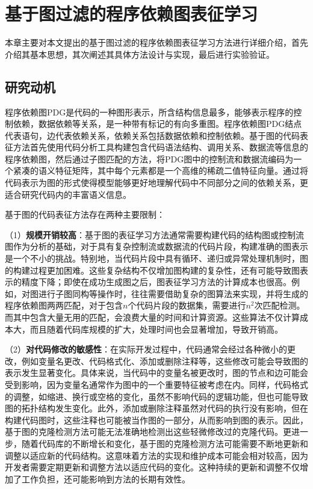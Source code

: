 \chapter{基于图过滤的程序依赖图表征学习}
\label{chap:PDG}
本章主要对本文提出的基于图过滤的程序依赖图表征学习方法进行详细介绍，首先介绍其基本思想，其次阐述其具体方法设计与实现，最后进行实验验证。

\section{研究动机}
\label{sec:PDGMotivation}

程序依赖图PDG是代码的一种图形表示，所含结构信息最多，能够表示程序的控制依赖，数据依赖等关系，是一种带有标记的有向多重图。程序依赖图PDG结点代表语句，边代表依赖关系，依赖关系包括数据依赖和控制依赖。基于图的代码表征方法首先使用代码分析工具构建包含代码语法结构、调用关系、数据流等信息的程序依赖图，然后通过子图匹配的方法，将PDG图中的控制流和数据流编码为一个紧凑的语义特征矩阵，其中每个元素都是一个高维的稀疏二值特征向量。通过将代码表示为图的形式使得模型能够更好地理解代码中不同部分之间的依赖关系，更适合研究代码内的丰富语义信息。

基于图的代码表征方法存在两种主要限制：

（1）\textbf{规模开销较高}：基于图的表征学习方法通常需要构建代码的结构图或控制流图作为分析的基础，对于具有复杂控制流或数据流的代码片段，构建准确的图表示是一个不小的挑战。特别地，当代码片段中具有循环、递归或异常处理机制时，图的构建过程更加困难。这些复杂结构不仅增加图构建的复杂性，还有可能导致图表示的精度下降；即使在成功生成图之后，图表征学习方法的计算成本也很高。例如，对图进行子图同构等操作时，往往需要借助复杂的图算法来实现，并将生成的程序依赖图两两匹配，对于包含$n$个代码片段的数据集，需要进行$n^2$次匹配检测。而其中包含大量无用的匹配，会浪费大量的时间和计算资源。这些算法不仅计算成本大，而且随着代码库规模的扩大，处理时间也会显著增加，导致开销高。

（2）\textbf{对代码修改的敏感性}：在实际开发过程中，代码通常会经过各种微小的更改，例如变量名更改、代码格式化、添加或删除注释等，这些修改可能会导致图的表示发生显著变化。具体来说，当代码中的变量名被更改时，图的节点和边可能会受到影响，因为变量名通常作为图中的一个重要特征被考虑在内。同样，代码格式的调整，如缩进、换行或空格的变化，虽然不影响代码的逻辑功能，但也可能导致图的拓扑结构发生变化。此外，添加或删除注释虽然对代码的执行没有影响，但在构建代码图时，这些注释也可能被当作图的一部分，从而影响到图的表示。因此，基于图的克隆检测方法可能无法准确地检测出这些轻微修改过的克隆代码。更进一步，随着代码库的不断增长和变化，基于图的克隆检测方法可能需要不断地更新和调整以适应新的代码结构。这意味着方法的实现和维护成本可能会相对较高，因为开发者需要定期更新和调整方法以适应代码的变化。这种持续的更新和调整不仅增加了工作负担，还可能影响到方法的长期有效性。

